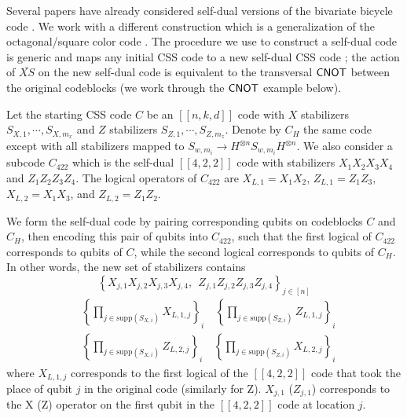 \documentclass[11pt]{article}
\begin{document}
Several papers have already considered self-dual versions of the bivariate bicycle code \cite{LiangChen2025Bivariate, Xu2025batched}.  We work with a different construction which is a generalization of the octagonal/square color code \cite{Bombin2006TopologicalQuantumDistillation}. The procedure we use to construct a self-dual code is generic and maps any initial CSS code to a new self-dual CSS code \cite{Criger2016NoiseThresholds422ToricCode, Bravyi2010MajoranaFermionCodes}; the action of $\bar{XS}$ on the new self-dual code is equivalent to the transversal $\mathsf{CNOT}$ between the original codeblocks (we work through the $\mathsf{CNOT}$ example below). 

Let the starting CSS code $C$ be an $[[n,k,d]]$ code with $X$ stabilizers $S_{X,1}, \cdots, S_{X, m_x}$ and $Z$ stabilizers $S_{Z,1}, \cdots, S_{Z, m_z}$.  Denote by $C_H$ the same code except with all stabilizers mapped to $S_{w,m_i} \rightarrow H^{\otimes n} S_{w,m_i} H^{\otimes n}$.  We also consider a subcode $C_{422}$ which is the self-dual $[[4,2,2]]$ code with stabilizers $X_1 X_2 X_3 X_4$ and $Z_1 Z_2 Z_3 Z_4$.  The logical operators of $C_{422}$ are $X_{L,1} = X_1 X_2$, $Z_{L,1} = Z_1 Z_3$, $X_{L,2} = X_1 X_3$, and $Z_{L,2} = Z_1 Z_2$.  

We form the self-dual code by pairing corresponding qubits on codeblocks $C$ and $C_H$, then encoding this pair of qubits into $C_{422}$, such that the first logical of $C_{422}$ corresponds to qubits of $C$, while the second logical corresponds to qubits of $C_H$. In other words, the new set of stabilizers contains
\begin{equation}
    \left \{ X_{j,1}X_{j,2}X_{j,3}X_{j,4}, ~~ Z_{j,1}Z_{j,2}Z_{j,3}Z_{j,4}\right \}_{j\in [n]}
\end{equation}
\begin{equation}
\begin{aligned}
    &\left \{\prod_{j\in \mathrm{supp}(S_{X,i})} X_{L,1,j} \right \}_i
    \quad \left \{\prod_{j\in \mathrm{supp}(S_{Z,i})} Z_{L,1,j}\right \}_i  \\
   &\left \{\prod_{j\in \mathrm{supp}(S_{X,i})} Z_{L,2,j}\right \}_i
   \quad \left \{\prod_{j\in \mathrm{supp}(S_{Z,i})} X_{L,2,j}\right \}_i 
\end{aligned}
\end{equation}
where $X_{L,1,j}$ corresponds to the first logical of the $[[4,2,2]]$ code that took the place of qubit $j$ in the original code (similarly for Z).  $X_{j,1}$ ($Z_{j,1}$) corresponds to the X (Z) operator on the first qubit in the $[[4,2,2]]$ code at location $j$.
\end{document}
